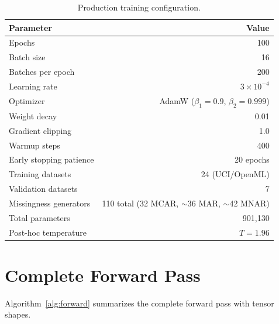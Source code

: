 \documentclass[11pt]{article}
\begin{document}
\begin{table}[h]
\centering
\caption{Production training configuration.}
\label{tab:training}
\begin{tabular}{lr}
\toprule
\textbf{Parameter} & \textbf{Value} \\
\midrule
Epochs & 100 \\
Batch size & 16 \\
Batches per epoch & 200 \\
Learning rate & $3 \times 10^{-4}$ \\
Optimizer & AdamW ($\beta_1 = 0.9$, $\beta_2 = 0.999$) \\
Weight decay & 0.01 \\
Gradient clipping & 1.0 \\
Warmup steps & 400 \\
Early stopping patience & 20 epochs \\
Training datasets & 24 (UCI/OpenML) \\
Validation datasets & 7 \\
Missingness generators & 110 total (32 MCAR, $\sim$36 MAR, $\sim$42 MNAR) \\
Total parameters & 901,130 \\
Post-hoc temperature & $T = 1.96$ \\
\bottomrule
\end{tabular}
\end{table}

\section{Complete Forward Pass}
\label{sec:forward}

Algorithm~\ref{alg:forward} summarizes the complete forward pass with tensor shapes.
\end{document}
